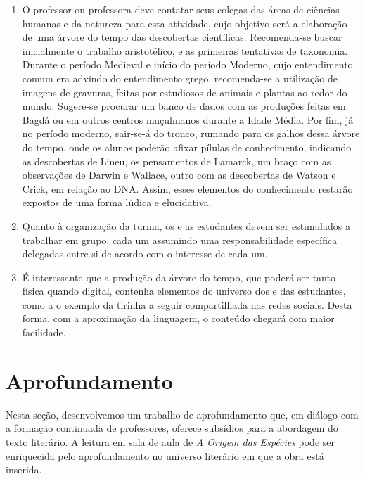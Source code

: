 \documentclass[11pt]{extarticle}
\begin{document}
\begin{enumerate}

	\item
	O professor ou professora deve contatar seus colegas das áreas de ciências
	humanas e da natureza para esta atividade, cujo objetivo será a elaboração
	de uma árvore do tempo das descobertas científicas.
	Recomenda-se buscar inicialmente o trabalho	aristotélico, e as primeiras tentativas 
	de taxonomia. Durante o período Medieval e início do período Moderno, cujo entendimento comum era advindo do
	entendimento grego, recomenda-se a utilização de imagens de gravuras, feitas
	por estudiosos de animais e plantas ao redor do mundo. Sugere-se procurar um
	banco de dados com as produções feitas em Bagdá ou em outros centros muçulmanos
	durante a Idade Média.
	Por fim, já no período moderno, sair-se-á do tronco, rumando para os galhos
	dessa árvore do tempo, onde os alunos poderão afixar pílulas de conhecimento,
	indicando as descobertas de Lineu, os pensamentos de Lamarck, um braço com as
	observações de Darwin e Wallace, outro com as descobertas de Watson e Crick, em
	relação ao DNA. Assim, esses elementos do conhecimento restarão expostos de uma forma lúdica
	e elucidativa.

	\item
	Quanto à organização da turma, os e as estudantes devem ser estimulados a trabalhar
	em grupo, cada um assumindo uma responsabilidade específica delegadas entre si
	de acordo com o interesse de cada um. 

	\item
	É interessante que a produção da árvore do tempo, que poderá ser tanto física
	quando digital, contenha elementos do universo dos e das estudantes, como 
	a o exemplo da tirinha a seguir compartilhada nas redes sociais. Desta forma,
	com a aproximação da linguagem, o conteúdo chegará com maior facilidade. 


\end{enumerate}




\section{Aprofundamento}

Nesta seção, desenvolvemos um trabalho de aprofundamento que, em diálogo com
a formação continuada de professores, oferece subsídios para a abordagem do
texto literário. A leitura em sala de aula de \emph{A Origem das Espécies} pode
ser enriquecida pelo aprofundamento no universo literário em que a obra está
inserida.
\end{document}
